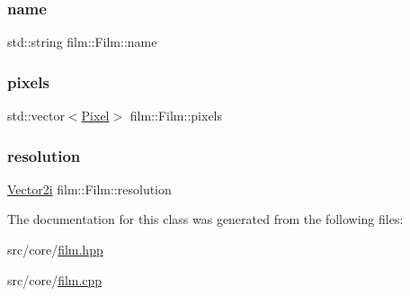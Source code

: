 \mbox{\label{classfilm_1_1Film_afe6ec2d1649ef253c027e2773c22bd88}} 
\subsubsection{\texorpdfstring{name}{name}}
{\footnotesize\ttfamily std\+::string film\+::\+Film\+::name}

\mbox{\label{classfilm_1_1Film_a53c27dc92a966e18407dafacb53be199}} 
\subsubsection{\texorpdfstring{pixels}{pixels}}
{\footnotesize\ttfamily std\+::vector$<$\mbox{\hyperlink{structfilm_1_1Pixel}{Pixel}}$>$ film\+::\+Film\+::pixels}

\mbox{\label{classfilm_1_1Film_ac4f1015b0be5846fa685db493474e161}} 
\subsubsection{\texorpdfstring{resolution}{resolution}}
{\footnotesize\ttfamily \mbox{\hyperlink{cyclop_8hpp_ac9c6c66d543f1c0c5bc66579727dae30}{Vector2i}} film\+::\+Film\+::resolution}



The documentation for this class was generated from the following files\+:\begin{DoxyCompactItemize}
\item 
src/core/\mbox{\hyperlink{film_8hpp}{film.\+hpp}}\item 
src/core/\mbox{\hyperlink{film_8cpp}{film.\+cpp}}\end{DoxyCompactItemize}
